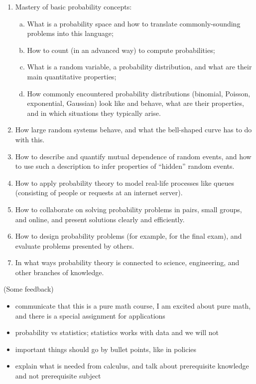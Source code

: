 \documentclass[oneside,11pt]{amsart}
\newcommand{\note}[1]{{\Large\sf{}\color{blue}(#1)}}
\begin{document}
\begin{enumerate}[\bf{}1.]
	\item Mastery of basic probability concepts:
	\begin{enumerate}[(a)]
		\item What is a probability space and how to translate commonly-sounding problems into this language;
		\item How to count (in an advanced way) to compute probabilities;
		\item What is a random variable, a probability distribution,
		and what are their main quantitative properties;
		\item 
		How commonly encountered probability 
		distributions (binomial, Poisson, exponential, Gaussian) look like and behave,
		what are 
		their properties, and in which situations they typically arise.
	\end{enumerate}

	\item How large random systems behave, and what the 
	bell-shaped curve
	has to do with this.
	\item How to describe and quantify mutual dependence of random events,
	and how to use such a description 
	to infer properties of ``hidden'' random events.
	\item How to apply probability theory to model real-life processes like queues
	(consisting of people or requests at an internet server).
	\item How to collaborate on solving probability problems in pairs, small groups, and online,
	and present solutions clearly and efficiently.
	\item How to design probability problems (for example, for the 
	final exam), and evaluate problems presented by others.
	\item In what ways probability theory is connected to science,
	engineering, and other branches of knowledge.
\end{enumerate}

\newpage

\note{Some feedback}

\begin{itemize}
	\item communicate that this is a pure math course, I am excited about pure math, 
	and there is a special assignment for applications
	\item probability vs statistics; statistics works with data and we will not
	\item important things should go by bullet points, like in policies
	\item explain what is needed from calculus, and talk about prerequisite
	knowledge and not prerequisite subject
\end{itemize}
\end{document}
